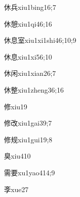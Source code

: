 \begin{verbete}{休兵}{xiu1bing1}{6;7}
\end{verbete}

\begin{verbete}{休憩}{xiu1qi4}{6;16}
\end{verbete}

\begin{verbete}{休息室}{xiu1xi1shi4}{6;10;9}
\end{verbete}

\begin{verbete}{休息}{xiu1xi5}{6;10}
\end{verbete}

\begin{verbete}{休闲}{xiu1xian2}{6;7}
\end{verbete}

\begin{verbete}{休整}{xiu1zheng3}{6;16}
\end{verbete}

\begin{verbete}{修}{xiu1}{9}
\end{verbete}

\begin{verbete}{修改}{xiu1gai3}{9;7}
\end{verbete}

\begin{verbete}{修规}{xiu1gui1}{9;8}
\end{verbete}

\begin{verbete}{臭}{xiu4}{10}
\end{verbete}

\begin{verbete}{需要}{xu1yao4}{14;9}
\end{verbete}

\begin{verbete}{斈}{xue2}{7}
\end{verbete}

